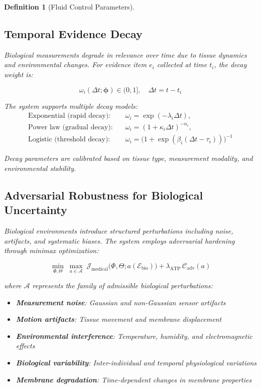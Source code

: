 \documentclass[12pt,a4paper]{article}
\newtheorem{definition}{Definition}
\begin{document}
\begin{definition}[Fluid Control Parameters]
\subsection{Temporal Evidence Decay}

Biological measurements degrade in relevance over time due to tissue dynamics and environmental changes. For evidence item $e_i$ collected at time $t_i$, the decay weight is:

\begin{equation}
\omega_i(\Delta t; \bm{\phi}) \in (0,1], \quad \Delta t = t - t_i
\end{equation}

The system supports multiple decay models:
\begin{align}
\text{Exponential (rapid decay):}\quad & \omega_i = \exp(-\lambda_i \Delta t), \\
\text{Power law (gradual decay):}\quad & \omega_i = (1 + \kappa_i \Delta t)^{-\alpha_i}, \\
\text{Logistic (threshold decay):}\quad & \omega_i = \bigl(1 + \exp(\beta_i(\Delta t - \tau_i))\bigr)^{-1}
\end{align}

Decay parameters are calibrated based on tissue type, measurement modality, and environmental stability.

\subsection{Adversarial Robustness for Biological Uncertainty}

Biological environments introduce structured perturbations including noise, artifacts, and systematic biases. The system employs adversarial hardening through minimax optimization:

\begin{equation}
\min_{\Phi,\Theta} \; \max_{a \in \mathcal{A}} \; \mathcal{J}_{\text{medical}}\bigl(\Phi,\Theta; a(\mathcal{E}_{\text{bio}})\bigr) + \lambda_{\text{ATP}}\, \mathcal{C}_{\text{adv}}(a)
\end{equation}

where $\mathcal{A}$ represents the family of admissible biological perturbations:

\begin{itemize}
\item \textbf{Measurement noise}: Gaussian and non-Gaussian sensor artifacts
\item \textbf{Motion artifacts}: Tissue movement and membrane displacement
\item \textbf{Environmental interference}: Temperature, humidity, and electromagnetic effects
\item \textbf{Biological variability}: Inter-individual and temporal physiological variations
\item \textbf{Membrane degradation}: Time-dependent changes in membrane properties
\end{itemize}


\end{definition}
\end{document}
